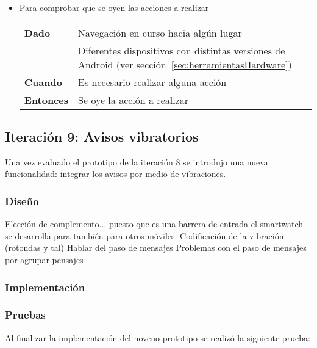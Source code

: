 \begin{itemize}
  \item Para comprobar que se oyen las acciones a realizar

  \begin{tabular}{p{}p{}}
    \hline
    \textbf{Dado}     & Navegación en curso hacia algún lugar \\
                      & Diferentes dispositivos con distintas versiones de Android (ver
                        sección~\ref{sec:herramientasHardware}) \\
    \textbf{Cuando}   & Es necesario realizar alguna acción \\
    \textbf{Entonces} & Se oye la acción a realizar \\
    \hline
  \end{tabular}
\end{itemize}

\subsection{Iteración 9: Avisos vibratorios}

Una vez evaluado el prototipo de la iteración 8 se introdujo una nueva funcionalidad: integrar los
avisos por medio de vibraciones.

\subsubsection{Diseño}



Elección de complemento... puesto que es una barrera de entrada el smartwatch se desarrolla para
también para otros móviles.
Codificación de la vibración (rotondas y tal)
Hablar del paso de mensajes
Problemas con el paso de mensajes por agrupar pensajes
\subsubsection{Implementación}

\begin{listing}[
  float=ht,
  language = java,
  caption  = {},
  label    = code:]

\end{listing}
\subsubsection{Pruebas}

Al finalizar la implementación del noveno prototipo se realizó la siguiente prueba:

